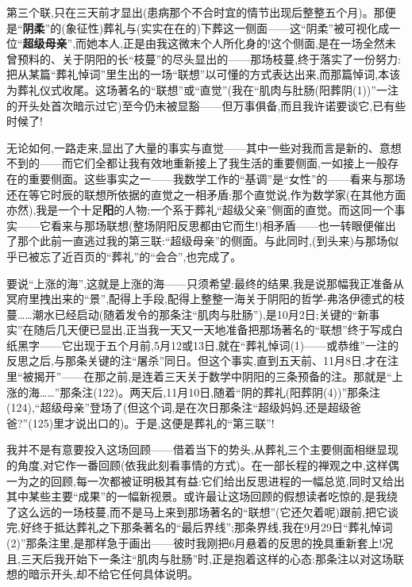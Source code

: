 第三个联,只在三天前才显出(患病那个不合时宜的情节出现后整整五个月)。那便是\dmark{}“\textbf{阴柔}”的(象征性)葬礼与(实实在在的)下葬这一侧面——这“阴柔”被可视化成一位“\textbf{超级母亲}”,而她本人,正是由我这微末个人所化身的!这个侧面,是在一场全然未曾预料的、关于阴阳的长“枝蔓”的尽头显出的——那场枝蔓,终于落实了一份努力:把从某篇“葬礼悼词”里生出的一场“联想”以可懂的方式表达出来,而那篇悼词,本该为葬礼仪式收尾。这场著名的“联想”或“直觉”(我在“肌肉与肚肠(阳葬阴(1))”一注的开头处首次暗示过它)至今仍未被显豁——但万事俱备,而且我许诺要谈它,已有些时候了!

无论如何,一路走来,显出了大量的事实与直觉——其中一些对我而言是新的、意想不到的——而它们全都让我有效地重新接上了我生活的重要侧面,一如接上一般存在的重要侧面。这些事实之一——我数学工作的“基调”是“女性”的——看来与那场还在等它时辰的联想所依据的直觉之一相矛盾:那个直觉说,作为数学家(在其他方面亦然),我是一个十足\textbf{阳}的人物;一个系于葬礼“超级父亲”侧面的直觉。而这同一个事实——它看来与那场联想(整场阴阳反思都由它而生!)相矛盾——也一转眼便催出了那个此前一直逃过我的第三联:“超级母亲”的侧面。与此同时,(到头来)与那场似乎已被忘了近百页的“葬礼”的“会合”,也完成了。

要说“上涨的海”,这就是上涨的海——只须希望:最终的结果,我是说那幅我正准备从冥府里拽出来的“景”,配得上手段,配得上整整一海关于阴阳的哲学-弗洛伊德式的枝蔓……潮水已经启动(随着发令的那条注“肌肉与肚肠”),是10月2日;关键的“新事实”在随后几天便已显出,\dmark{}正当我一天又一天地准备把那场著名的“联想”终于写成白纸黑字——它出现于五个月前,5月12或13日,就在“葬礼悼词(1)——或恭维”一注的反思之后,与那条关键的注“屠杀”同日。但这个事实,直到五天前、11月8日,才在注里“被揭开”——在那之前,是连着三天关于数学中阴阳的三条预备的注。那就是“上涨的海……”那条注(122)。两天后,11月10日,随着“阴的葬礼(阳葬阴(4))”那条注(124),“超级母亲”登场了(但这个词,是在次日那条注“超级妈妈,还是超级爸爸?”(125)里才说出口的)。于是,这便是葬礼的“第三联”!

我并不是有意要投入这场回顾——借着当下的势头,从葬礼三个主要侧面相继显现的角度,对它作一番回顾(依我此刻看事情的方式)。在一部长程的禅观之中,这样偶一为之的回顾,每一次都被证明极其有益:它们给出反思进程的一幅总览,同时又给出其中某些主要“成果”的一幅新视景。或许最让这场回顾的假想读者吃惊的,是我绕了这么远的一场枝蔓,而不是马上来到那场著名的“联想”(它还欠着呢)跟前,把它谈完,好终于抵达葬礼之下那条著名的“最后界线\dmark{}”;那条界线,我在9月29日“葬礼悼词(2)”那条注里,是那样急于画出——彼时我刚把6月悬着的反思的挽具重新套上!况且,三天后我开始下一条注“肌肉与肚肠”时,正是抱着这样的心态:那条注以对这场联想的暗示开头,却不给它任何具体说明。

